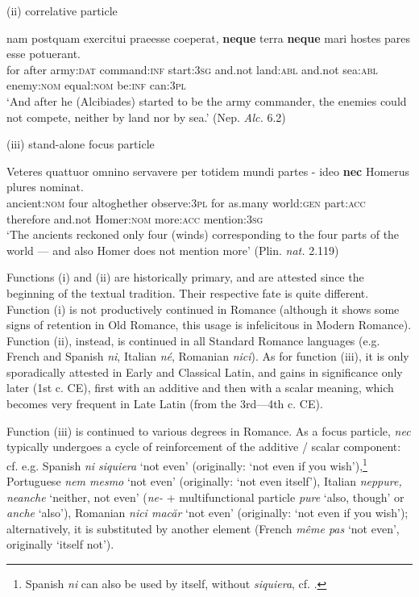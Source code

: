 \documentclass[output=paper,modfonts,nonflat,citecolor=brown,
showindex
]{langsci/langscibook}
\begin{document}
{\begin{exe}
\ex (ii) correlative particle 

\label{firstcorrelativenec} \gll nam postquam exercitui praeesse coeperat, {\textbf{neque}} terra {\textbf{neque}} mari hostes pares esse potuerant.\\
for after army:{\textsc{dat}} command:{\textsc{inf}} start:{\textsc{3sg}} and.not land:{\textsc{abl}} and.not sea:{\textsc{abl}} enemy:{\textsc{nom}} equal:{\textsc{nom}} be:{\textsc{inf}} can:{\textsc{3pl}}\\

`And after he (Alcibiades) started to be the army commander, the enemies could not compete, neither by land nor by sea.'
(Nep. {\emph{Alc.}} 6.2)
\end{exe}}

{\begin{exe}
\ex (iii) stand-alone focus particle 

\label{firstfocusnec} \gll Veteres quattuor omnino servavere per totidem mundi partes {- ideo} {\textbf{nec}} Homerus plures nominat.\\
ancient:{\textsc{nom}} four altoghether observe:{\textsc{3pl}} for as.many world:{\textsc{gen}} part:{\textsc{acc}} therefore and.not Homer:{\textsc{nom}} more:{\textsc{acc}} mention:{\textsc{3sg}}\\

`The ancients reckoned only four (winds) corresponding to the four parts of the world --- and also Homer does not mention more' (Plin. {\emph{nat.}} 2.119)
\end{exe}}

\noindent Functions (i) and (ii) are historically primary, and are attested since the beginning of the textual tradition. Their respective fate is quite different. Function (i) is not productively continued in Romance (although it shows some signs of retention in Old Romance, this usage is infelicitous in Modern Romance). Function (ii), instead, is continued in all Standard Romance languages (e.g. French and Spanish {\emph{ni}}, Italian {\emph{n\'e}}, Romanian {\emph{nici}}). As for function (iii), it is only sporadically attested in Early and Classical Latin, and gains in significance only later (1st c. CE), first with an additive and then with a scalar meaning, which becomes very frequent in Late Latin (from the 3rd---4th c. CE). 

Function (iii) is continued to various degrees in Romance. As a focus particle, {\emph{nec}} typically undergoes a cycle of reinforcement of the additive / scalar component: cf. e.g. Spanish {\emph{ni siquiera}} `not even' (originally: `not even if you wish'),{\footnote{Spanish {\emph{ni}} can also be used by itself, without {\emph{siquiera}}, cf. \citet[]{Aranovich06}.}} Portuguese {\emph{nem mesmo}} `not even' (originally: `not even itself'), Italian {\emph{neppure, neanche}} `neither, not even' ({\emph{ne-}} + multifunctional particle {\emph{pure}} `also, though' or {\emph{anche}} `also'), Romanian {\emph{nici mac\u{a}r}} `not even' (originally: `not even if you wish'); alternatively, it is substituted by another element (French {\emph{m\^eme pas}} `not even', originally `itself not'). 
\end{document}

